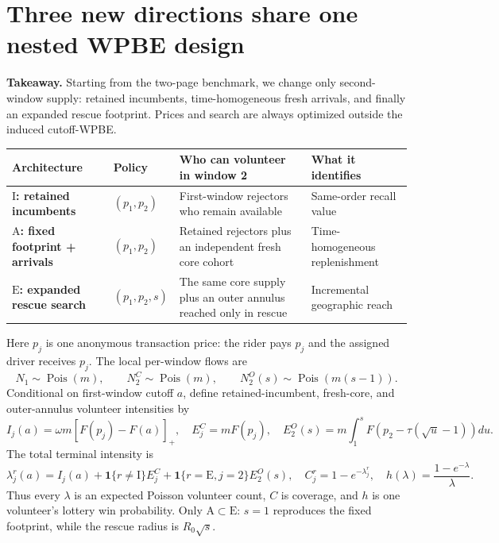 \documentclass[11pt]{article}
\newcommand{\takeaway}[1]{\par\smallskip\noindent\textbf{Takeaway.} #1\par\smallskip}
\newcommand{\regI}{\mathrm I}
\newcommand{\regA}{\mathrm A}
\newcommand{\regE}{\mathrm E}
\begin{document}
\setcounter{page}{3}
\setcounter{section}{1}

\section{Three new directions share one nested WPBE design}

\takeaway{Starting from the two-page benchmark, we change only second-window
supply: retained incumbents, time-homogeneous fresh arrivals, and finally an
expanded rescue footprint.  Prices and search are always optimized outside the
induced cutoff-WPBE.}

\begin{center}
\small
\renewcommand{\arraystretch}{1.18}
\begin{tabularx}{.99\textwidth}{@{}L{2.05cm}L{2.25cm}Y L{2.35cm}@{}}
\toprule
Architecture & Policy & Who can volunteer in window 2 & What it identifies\\
\midrule
{}
\textcolor{incpurple}{\textbf{$\regI$: retained incumbents}} & $(p_1,p_2)$ & First-window rejectors who remain available & Same-order recall value\\
\textcolor{arrivalgreen}{\textbf{$\regA$: fixed footprint + arrivals}} & $(p_1,p_2)$ & Retained rejectors plus an independent fresh core cohort & Time-homogeneous replenishment\\
\textcolor{searchblue}{\textbf{$\regE$: expanded rescue search}} & $(p_1,p_2,s)$ & The same core supply plus an outer annulus reached only in rescue & Incremental geographic reach\\
\bottomrule
\end{tabularx}
\end{center}

Here $p_j$ is one anonymous transaction price: the rider pays $p_j$ and the
assigned driver receives $p_j$.  The local per-window flows are
\[
N_1\sim\operatorname{Pois}(m),\qquad
N_2^C\sim\operatorname{Pois}(m),\qquad
N_2^O(s)\sim\operatorname{Pois}(m(s-1)).
\tag{5}
\]
Conditional on first-window cutoff $a$, define retained-incumbent, fresh-core,
and outer-annulus volunteer intensities by
\[
 I_j(a)=\omega m[F(p_j)-F(a)]_+,\quad
 E_j^C=mF(p_j),\quad
 E_2^O(s)=m\!\int_1^s F\!\left(p_2-\tau(\sqrt u-1)\right)du.       \tag{6}
\]
The total terminal intensity is
\[
 \lambda_j^r(a)=I_j(a)+\mathbf 1\{r\ne\regI\}E_j^C
 +\mathbf 1\{r=\regE,j=2\}E_2^O(s),\quad
 C_j^r=1-e^{-\lambda_j^r},\quad h(\lambda)=\frac{1-e^{-\lambda}}{\lambda}.
\tag{7}
\]
Thus every $\lambda$ is an expected Poisson volunteer count, $C$ is coverage,
and $h$ is one volunteer's lottery win probability.  Only
$\regA\subset\regE$: $s=1$ reproduces the fixed footprint, while the rescue
radius is $R_0\sqrt{s}$.
\end{document}
